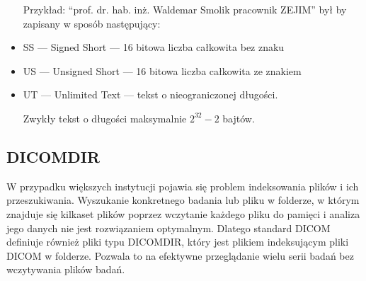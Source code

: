 \begin{itemize}
          Przykład: \enquote{prof. dr. hab. inż. Waldemar Smolik pracownik ZEJIM} był by zapisany w sposób następujący: 

    \item SS --- Signed Short --- 16 bitowa liczba całkowita bez znaku

    \item US --- Unsigned Short --- 16 bitowa liczba całkowita ze znakiem

    \item UT --- Unlimited Text --- tekst o nieograniczonej długości.

          Zwykły tekst o długości maksymalnie $2^{32}-2$ bajtów.
\end{itemize}

\subsection{DICOMDIR}

W przypadku większych instytucji pojawia się problem indeksowania plików i ich przeszukiwania.
Wyszukanie konkretnego badania lub pliku w folderze, w którym znajduje się kilkaset plików poprzez wczytanie każdego pliku do pamięci i analiza jego danych nie jest rozwiązaniem optymalnym.
Dlatego standard DICOM definiuje również pliki typu DICOMDIR, który jest plikiem indeksującym pliki DICOM w folderze.
Pozwala to na efektywne przeglądanie wielu serii badań bez wczytywania plików badań.
